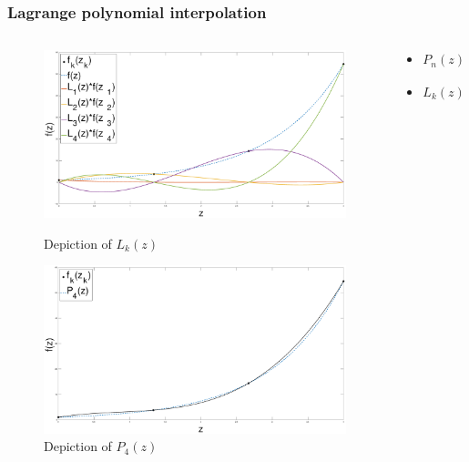 \documentclass{beamer}
\begin{document}
\begin{frame}
\frametitle{Lagrange polynomial interpolation}
\vspace{-1.5cm}
\begin{columns}[onlytextwidth]
	\begin{column}{0.5\textwidth}
		\begin{center}
			\begin{figure}
				\includegraphics[trim={0 0cm 0 0cm},clip,width=1\textwidth]{FIGURES/lag_interp_plot1.eps}
					\vspace{-0.5cm}
					\caption{Depiction of $L_k(z)$}
										\vspace{-0.35cm}
				\includegraphics[trim={0 0cm 0 0cm},clip,width=1\textwidth]{FIGURES/lag_interp_plot2.eps}
					\caption{Depiction of $P_4(z)$}
		\end{figure}
		\end{center}
	\end{column}
	\begin{column}{0.5\textwidth}
		\vspace{1.5cm}
		\begin{center}
			\begin{itemize}
				\item $P_n(z) = \sum_{k=0}^{n} L_k(z)f_k $
				\vspace{0.5cm}
				\item $L_k(z) =  \prod_{j=0, j \neq k}^{n} \frac{z-z_j}{z_k-z_j}$
			\end{itemize}
		\end{center}
	\end{column}
\end{columns}
\end{frame}
\end{document}
